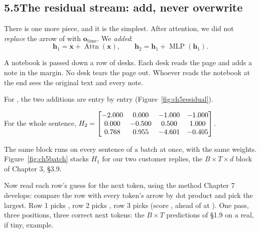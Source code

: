 \subsection*{5.5\quad The residual stream: add, never overwrite}

There is one more piece, and it is the simplest. After attention, we did not \emph{replace} the arrow of
 with $\bm{o}_{\text{time}}$. We \emph{added}:
\[
\bm{h}_1 = \bm{x} + \operatorname{Attn}(\bm{x}), \qquad \bm{h}_2 = \bm{h}_1 + \operatorname{MLP}(\bm{h}_1).
\]

\Picture A notebook is passed down a row of desks. Each desk reads the page and adds a note in the margin. No
desk tears the page out. Whoever reads the notebook at the end sees the original text and every note.

\Exactly For , the two additions are entry by entry (Figure~\ref{fig:ch5residual}).

\begin{center}
\fitwidthFourFive{}
\label{fig:ch5residual}
\end{center}

For the whole sentence, $H_2=\begin{bmatrix}-2.000 & 0.000 & -1.000 & -1.000 \\ 0.000 & -0.500 & 0.500 & 1.000 \\ 0.768 & 0.955 & -4.601 & -0.405\end{bmatrix}$.

The same block runs on every sentence of a batch at once, with the same weights. Figure~\ref{fig:ch5batch}
stacks $H_1$ for our two customer replies, the $B\times T\times d$ block of Chapter 3, \S3.9.

\begin{center}
\fitwidthFourFive{}
\label{fig:ch5batch}
\end{center}


Now read each row's guess for the next token, using the method Chapter 7 develops: compare the row with every
token's arrow by dot product and pick the largest. Row 1 picks \tok{\nFivePredWaste}, row 2 picks
\tok{\nFivePredOf}, row 3 picks \tok{\nFivePredTime} (score \nFiveLogitSorry, ahead of \tok{\nFiveTopTwoTime} at
\nFiveTopTwoTimeLogit). One pass, three positions, three correct next tokens: the $B\times T$ predictions of
\S1.9 on a real, if tiny, example.

